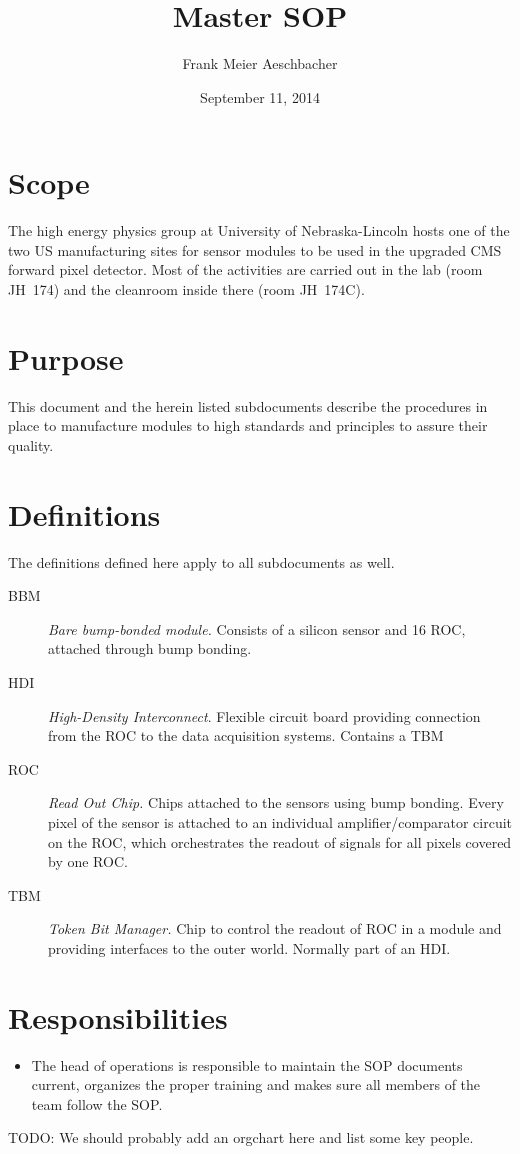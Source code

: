 \documentclass[12pt]{unlsilabsop}
\title{Master SOP}
\date{September 11, 2014}
\author{Frank Meier Aeschbacher}
\begin{document}
\maketitle

\section{Scope}
The high energy physics group at University of Nebraska-Lincoln hosts one of the two US manufacturing sites for sensor modules to be used in the upgraded CMS forward pixel detector. Most of the activities are carried out in the lab (room JH~174) and the cleanroom inside there (room JH~174C).

\section{Purpose}
This document and the herein listed subdocuments describe the procedures in place to manufacture modules to high standards and principles to assure their quality.

\section{Definitions}
The definitions defined here apply to all subdocuments as well.
\begin{description}
    \item[BBM] \emph{Bare bump-bonded module.} Consists of a silicon sensor and 16 ROC, attached through bump bonding.
    \item[HDI] \emph{High-Density Interconnect}. Flexible circuit board providing connection from the ROC to the data acquisition systems. Contains a TBM
    \item[ROC] \emph{Read Out Chip.} Chips attached to the sensors using bump bonding. Every pixel of the sensor is attached to an individual amplifier/comparator circuit on the ROC, which orchestrates the readout of signals for all pixels covered by one ROC.
    \item[TBM] \emph{Token Bit Manager.} Chip to control the readout of ROC in a module and providing interfaces to the outer world. Normally part of an HDI.
\end{description}

\section{Responsibilities}
\begin{itemize}
    \item The head of operations is responsible to maintain the SOP documents current, organizes the proper training and makes sure all members of the team follow the SOP.
\end{itemize}
TODO: We should probably add an orgchart here and list some key people.
\end{document}
